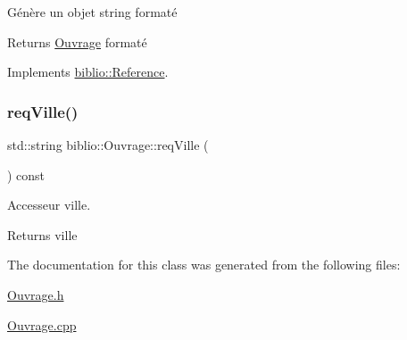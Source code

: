 Génère un objet string formaté 

\begin{DoxyReturn}{Returns}
\hyperlink{classbiblio_1_1Ouvrage}{Ouvrage} formaté 
\end{DoxyReturn}


Implements \hyperlink{classbiblio_1_1Reference}{biblio\+::\+Reference}.

\mbox{\label{classbiblio_1_1Ouvrage_a9118fb41bc14debb563864920f957de7}} 
\subsubsection{\texorpdfstring{req\+Ville()}{reqVille()}}
{\footnotesize\ttfamily std\+::string biblio\+::\+Ouvrage\+::req\+Ville (\begin{DoxyParamCaption}{ }\end{DoxyParamCaption}) const\hspace{0.3cm}{\ttfamily [inline]}}



Accesseur ville. 

\begin{DoxyReturn}{Returns}
ville 
\end{DoxyReturn}


The documentation for this class was generated from the following files\+:\begin{DoxyCompactItemize}
\item 
\hyperlink{Ouvrage_8h}{Ouvrage.\+h}\item 
\hyperlink{Ouvrage_8cpp}{Ouvrage.\+cpp}\end{DoxyCompactItemize}
